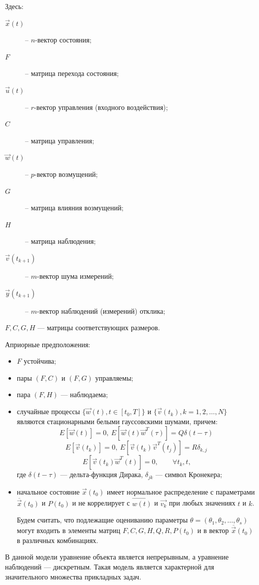 \documentclass[a4paper,14pt]{extarticle}
\begin{document}
Здесь:
\begin{description}
  \item [$\vec{x}(t)$] -- $n$-вектор состояния;
  \item [$F$] -- матрица перехода состояния;
  \item [$\vec{u}(t)$] -- $r$-вектор управления (входного воздействия);
  \item [$C$] -- матрица управления;
  \item [$\vec{w}(t)$] -- $p$-вектор возмущений;
  \item [$G$] -- матрица влияния возмущений;
  \item [$H$] -- матрица наблюдения;
  \item [$\vec{v}(t_{k+1})$] -- $m$-вектор шума измерений;
  \item [$\vec{y}(t_{k+1})$] -- $m$-вектор наблюдений (измерений) отклика;
\end{description}

$F, C, G, H$ --- матрицы соответствующих размеров.

\bigskip
Априорные предположения:
\begin{itemize}
\item $F$ устойчива;
\item пары $(F, C)$ и $(F, G)$ управляемы;
\item пара $(F, H)$ --- наблюдаема;
\item случайные процессы $\{\vec{w}(t), t \in [t_0, T]\}$ и
	$\{\vec{v}(t_{k}), k = 1, 2, \ldots, N\}$ являются стационарными белыми
		гауссовскими шумами, причем:
\[
	E[\vec{w}(t)] = 0,\ E[\vec{w}(t)\vec{w}^{T}(\tau)] = Q \delta(t-\tau)\,
\]
\[
	E[\vec{v}(t_k)] = 0,\ E[\vec{v}(t_k)\vec{v}^{T}(t_j)] = R \delta_{k,j}\,
\]
\[
	E[\vec{v}(t_k)\vec{w}^{T}(t)] = 0,\qquad \forall t_k, t,
\]
		где $\delta(t-\tau)$ --- дельта-функция Дирака, $\delta_{jk}$ --- символ
		Кронекера;

\item начальное состояние $\vec{x}(t_0)$ имеет нормальное распределение с
параметрами $\overline{\vec{x}}(t_0)$ и $P(t_0)$ и не коррелирует с
		$\vec{w(t)}$ и $\vec{v_k}$ при любых значениях $t$ и $k$.

Будем считать, что подлежащие оцениванию параметры $\theta = (\theta_1,
\theta_2, \ldots, \theta_s)$ могут входить в элементы матриц $F, C, G, H, Q, R,
P(t_0)$ и в вектор $\overline{\vec{x}}(t_0)$ в различных комбинациях.

\end{itemize}

В данной модели уравнение объекта является непрерывным, а уравнение наблюдений
--- дискретным. Такая модель является характерной для значительного множества
прикладных задач.
\end{document}

